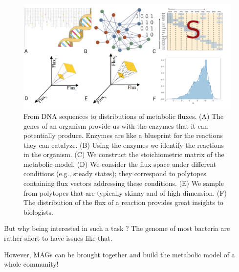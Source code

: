    \begin{figure}[!htbp]
      \includegraphics[width=1.0\columnwidth]{figures/flux_sampling_workflow.png}
      \caption[From DNA sequences to distributions of metabolic fluxes]{
         From DNA sequences to distributions of metabolic fluxes.
         (A) The genes of an organism provide us with the enzymes that it can potentially produce. Enzymes are like a blueprint for the reactions they can catalyze.
         (B) Using the enzymes we identify the reactions in the organism.
         (C) We construct the stoichiometric matrix of the metabolic  model.
         (D) We consider the flux space under different conditions (e.g., steady states);
         they correspond  to  polytopes containing flux vectors addressing these conditions.
         (E) We sample from polytopes that are typically skinny and of high dimension.
         (F) The distribution of the flux of a reaction provides  great insights
         to biologists.
      }
      \label{fig:sampling_workflow}
   \end{figure}

   But why being interested in such a task ? The genome of most bacteria are rather short to have issues like that. 

   However, MAGs can be brought together and build the metabolic model of a whole community! 



